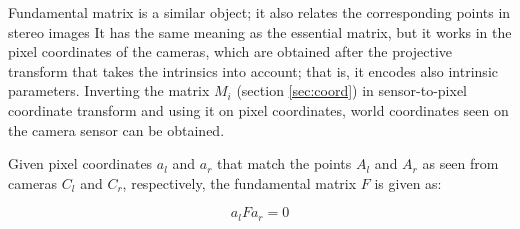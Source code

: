 
%
%

Fundamental matrix is a similar object; it also relates the corresponding points in stereo images
It has the same meaning as the essential matrix, but it works in the pixel coordinates of the cameras, which are obtained after the projective transform that takes the intrinsics into account; that is, it encodes also intrinsic parameters.
Inverting the matrix $M_i$ (section \ref{sec:coord}) in sensor-to-pixel coordinate transform and using it on pixel coordinates, world coordinates seen on the camera sensor can be obtained. %

Given pixel coordinates $a_l$ and $a_r$ that match the points $A_l$ and $A_r$ as seen from cameras $C_l$ and $C_r$, respectively, the fundamental matrix $F$ is given as:

\begin{equation} \label{eq:fundamental}
	a_l F a_r = 0
\end{equation}


%
%
%
%

